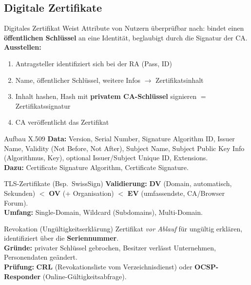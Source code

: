 \documentclass[a4paper, fontsize=7pt]{scrartcl}
\begin{document}
\subsection{Digitale Zertifikate}

\begin{mainbox}{Digitales Zertifikat}
Weist Attribute von Nutzern überprüfbar nach: bindet einen \textbf{öffentlichen
Schlüssel} an eine Identität, beglaubigt durch die Signatur der CA.\\
\textbf{Ausstellen:}
\begin{enumerate}
    \item Antragsteller identifiziert sich bei der RA (Pass, ID)
    \item Name, öffentlicher Schlüssel, weitere Infos $\to$ Zertifikatsinhalt
    \item Inhalt hashen, Hash mit \textbf{privatem CA-Schlüssel} signieren
          $=$ Zertifikatssignatur
    \item CA veröffentlicht das Zertifikat
\end{enumerate}
\end{mainbox}

\begin{mainbox}{Aufbau X.509}
\textbf{Data:} Version, Serial Number, Signature Algorithm ID, Issuer Name,
Validity (Not Before, Not After), Subject Name, Subject Public Key Info
(Algorithmus, Key), optional Issuer/Subject Unique ID, Extensions.\\
\textbf{Dazu:} Certificate Signature Algorithm, Certificate Signature.
\end{mainbox}

\begin{subbox}{TLS-Zertifikate (Bsp.\ SwissSign)}
\textbf{Validierung:} \textbf{DV} (Domain, automatisch, Sekunden) $<$ \textbf{OV}
(+ Organisation) $<$ \textbf{EV} (umfassendste, CA/Browser Forum).\\
\textbf{Umfang:} Single-Domain, Wildcard (Subdomains), Multi-Domain.
\end{subbox}

\begin{mainbox}{Revokation (Ungültigkeitserklärung)}
Zertifikat \emph{vor Ablauf} für ungültig erklären, identifiziert über die
\textbf{Seriennummer}.\\
\textbf{Gründe:} privater Schlüssel gebrochen, Besitzer verlässt Unternehmen,
Personendaten geändert.\\
\textbf{Prüfung:} \textbf{CRL} (Revokationsliste vom Verzeichnisdienst) oder
\textbf{OCSP-Responder} (Online-Gültigkeitsabfrage).
\end{mainbox}
\end{document}
